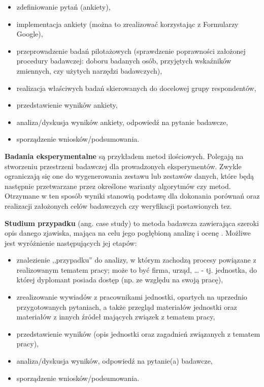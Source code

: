 \begin{itemize}
	\item zdefiniowanie pytań (ankiety),
	\item implementacja ankiety (można to zrealizować korzystając z Formularzy Google),
	\item przeprowadzenie badań pilotażowych (sprawdzenie poprawności założonej procedury badawczej: doboru badanych osób, przyjętych wskaźników zmiennych, czy użytych narzędzi badawczych),
	\item realizacja właściwych badań skierowanych do docelowej grupy respondentów,
	\item przedstawienie wyników ankiety, 
	\item analiza/dyskusja wyników ankiety, odpowiedź na pytanie badawcze,
	\item sporządzenie wniosków/podsumowania.
\end{itemize}

\textbf{Badania eksperymentalne} \citep{kopczewski2007ekonomia, brzezinski2015badania} są przykładem metod ilościowych. Polegają na stworzeniu przestrzeni badawczej dla prowadzonych eksperymentów. Zwykle ograniczają się one do wygenerowania zestawu lub zestawów danych, które będą następnie przetwarzane przez określone warianty algorytmów czy metod. Otrzymane w ten sposób wyniki stanowią podstawę dla dokonania porównań oraz realizacji założonych celów badawczych czy weryfikacji postawionych tez.

\textbf{Studium przypadku} (ang. case study) to metoda badawcza zawierająca szeroki opis danego zjawiska, mająca na celu jego pogłębioną analizę i ocenę \citep{baxter2008qualitative, crowe2011case}. Możliwe jest wyróżnienie następujących jej etapów:

\begin{itemize}
	\item znalezienie ,,przypadku'' do analizy, w którym zachodzą procesy powiązane z realizowanym tematem pracy; może to być firma, urząd, … - tj. jednostka, do której dyplomant posiada dostęp (np. ze względu na swoją pracę),
	\item zrealizowanie wywiadów z pracownikami jednostki, opartych na uprzednio przygotowanych pytaniach, a także przegląd materiałów jednostki oraz materiałów z innych źródeł mających związek z tematem pracy,
	\item przedstawienie wyników (opis jednostki oraz zagadnień związanych z tematem pracy),
	\item analiza/dyskusja wyników, odpowiedź na pytanie(a) badawcze,
	\item sporządzenie wniosków/podsumowania.
\end{itemize}

